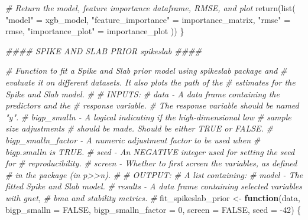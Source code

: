 \documentclass[
  11pt,
]{article}
\newenvironment{Shaded}{}{}
\newcommand{\AttributeTok}[1]{\textcolor[rgb]{0.49,0.56,0.16}{#1}}
\newcommand{\CommentTok}[1]{\textcolor[rgb]{0.38,0.63,0.69}{\textit{#1}}}
\newcommand{\ConstantTok}[1]{\textcolor[rgb]{0.53,0.00,0.00}{#1}}
\newcommand{\ControlFlowTok}[1]{\textcolor[rgb]{0.00,0.44,0.13}{\textbf{#1}}}
\newcommand{\DecValTok}[1]{\textcolor[rgb]{0.25,0.63,0.44}{#1}}
\newcommand{\DocumentationTok}[1]{\textcolor[rgb]{0.73,0.13,0.13}{\textit{#1}}}
\newcommand{\FunctionTok}[1]{\textcolor[rgb]{0.02,0.16,0.49}{#1}}
\newcommand{\NormalTok}[1]{#1}
\newcommand{\OtherTok}[1]{\textcolor[rgb]{0.00,0.44,0.13}{#1}}
\newcommand{\SpecialCharTok}[1]{\textcolor[rgb]{0.25,0.44,0.63}{#1}}
\newcommand{\StringTok}[1]{\textcolor[rgb]{0.25,0.44,0.63}{#1}}
\begin{document}
\begin{Shaded}
\begin{Highlighting}[]
  \CommentTok{\# Return the model, feature importance dataframe, RMSE, and plot}
  \FunctionTok{return}\NormalTok{(}\FunctionTok{list}\NormalTok{(}
    \StringTok{"model"} \OtherTok{=}\NormalTok{ xgb\_model,}
    \StringTok{"feature\_importance"} \OtherTok{=}\NormalTok{ importance\_matrix,}
    \StringTok{"rmse"} \OtherTok{=}\NormalTok{ rmse,}
    \StringTok{"importance\_plot"} \OtherTok{=}\NormalTok{ importance\_plot}
\NormalTok{  ))}
\NormalTok{\}}

\DocumentationTok{\#\#\#\# SPIKE AND SLAB PRIOR \textquotesingle{}spikeslab\textquotesingle{} \#\#\#\# }

\CommentTok{\# Function to fit a Spike and Slab prior model using \textquotesingle{}spikeslab\textquotesingle{} package and }
\CommentTok{\#   evaluate it on different datasets. It also plots the path of the }
\CommentTok{\#   estimates for the Spike and Slab model.}
\CommentTok{\#}
\CommentTok{\# INPUTS:}
\CommentTok{\#     data               {-} A data frame containing the predictors and the }
\CommentTok{\#                             response variable.}
\CommentTok{\#                          The response variable should be named "y".}
\CommentTok{\#     bigp\_smalln        {-} A logical indicating if the high{-}dimensional low }
\CommentTok{\#                             sample size adjustments}
\CommentTok{\#                          should be made. Should be either TRUE or FALSE.}
\CommentTok{\#     bigp\_smalln\_factor {-} A numeric adjustment factor to be used when }
\CommentTok{\#                             bigp.smalln is TRUE.}
\CommentTok{\#     seed               {-} An NEGATIVE integer used for setting the seed for }
\CommentTok{\#                             reproducibility.}
\CommentTok{\#     screen             {-} Whether to first screen the variables, as defined}
\CommentTok{\#                             in the package (in p\textgreater{}\textgreater{}n).}
\CommentTok{\#}
\CommentTok{\# OUTPUT:}
\CommentTok{\#     A list containing:}
\CommentTok{\#           model {-} The fitted Spike and Slab model.}
\CommentTok{\#           results {-} A data frame containing selected variables with gnet, }
\CommentTok{\#                     bma and stability metrics.}
\CommentTok{\#}
\NormalTok{fit\_spikeslab\_prior }\OtherTok{\textless{}{-}} \ControlFlowTok{function}\NormalTok{(data, }\AttributeTok{bigp\_smalln =} \ConstantTok{FALSE}\NormalTok{, }\AttributeTok{bigp\_smalln\_factor =} \DecValTok{0}\NormalTok{, }
                                \AttributeTok{screen =} \ConstantTok{FALSE}\NormalTok{, }\AttributeTok{seed =} \SpecialCharTok{{-}}\DecValTok{42}\NormalTok{) \{}
  

\end{Highlighting}
\end{Shaded}
\end{document}
